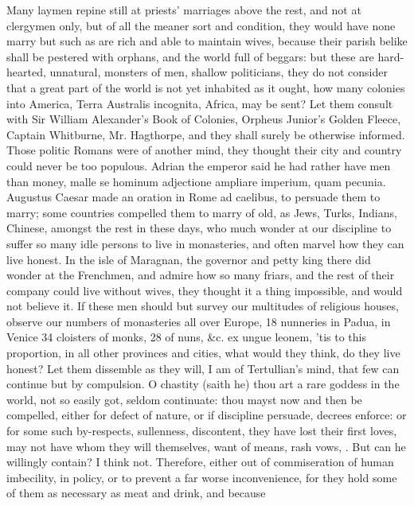Many laymen repine still at priests' marriages above the rest, and not
at clergymen only, but of all the meaner sort and condition, they would
have none marry but such as are rich and able to maintain wives,
because their parish belike shall be pestered with orphans, and the
world full of beggars: but these are hard-hearted, unnatural,
monsters of men, shallow politicians, they do not consider that a
great part of the world is not yet inhabited as it ought, how many
colonies into America, Terra Australis incognita, Africa, may be sent?
Let them consult with Sir William Alexander's Book of Colonies, Orpheus
Junior's Golden Fleece, Captain Whitburne, Mr. Hagthorpe, \etc{} and they
shall surely be otherwise informed. Those politic Romans were of
another mind, they thought their city and country could never be too
populous. Adrian the emperor said he had rather have men than
money, malle se hominum adjectione ampliare imperium, quam pecunia.
Augustus Caesar made an oration in Rome ad caelibus, to persuade them
to marry; some countries compelled them to marry of old, as Jews,
Turks, Indians, Chinese, amongst the rest in these days, who much
wonder at our discipline to suffer so many idle persons to live in
monasteries, and often marvel how they can live honest. In the
isle of Maragnan, the governor and petty king there did wonder at the
Frenchmen, and admire how so many friars, and the rest of their company
could live without wives, they thought it a thing impossible, and would
not believe it. If these men should but survey our multitudes of
religious houses, observe our numbers of monasteries all over Europe,
18 nunneries in Padua, in Venice 34 cloisters of monks, 28 of nuns, \&c.
ex ungue leonem, 'tis to this proportion, in all other provinces and
cities, what would they think, do they live honest? Let them dissemble
as they will, I am of Tertullian's mind, that few can continue but by
compulsion. O chastity (saith he) thou art a rare goddess in the
world, not so easily got, seldom continuate: thou mayst now and then be
compelled, either for defect of nature, or if discipline persuade,
decrees enforce: or for some such by-respects, sullenness, discontent,
they have lost their first loves, may not have whom they will
themselves, want of means, rash vows, \etc{}. But can he willingly contain?
I think not. Therefore, either out of commiseration of human
imbecility, in policy, or to prevent a far worse inconvenience, for
they hold some of them as necessary as meat and drink, and because
